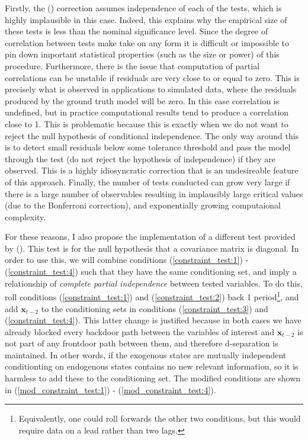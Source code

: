 \documentclass{article}
\begin{document}
Firstly, the \citeauthor{bonferroni1936teoria} (\citeyear{bonferroni1936teoria}) correction assumes independence of each of the tests, which is highly implausible in this case. Indeed, this explains why the empirical size of these tests is less than the nominal significance level. Since the degree of correlation between tests make take on any form it is difficult or impossible to pin down important statistical properties (such as the size or power) of this procedure. Furthermore, there is the issue that computation of partial correlations can be unstable if residuals are very close to or equal to zero. This is precisely what is observed in applications to simulated data, where the residuals produced by the ground truth model will be zero. In this case correlation is undefined, but in practice computational results tend to produce a correlation close to 1. This is problematic because this is exactly when we do not want to reject the null hypothesis of conditional independence. The only way around this is to detect small residuals below some tolerance threshold and pass the model through the test (do not reject the hypothesis of independence) if they are observed. This is a highly idiosyncratic correction that is an undesireable feature of this approach. Finally, the number of tests conducted can grow very large if there is a large number of observables resulting in implausibly large critical values (due to the Bonferroni correction), and exponentially growing computaional complexity.

For these reasons, I also propose the implementation of a different test provided by \citeauthor{srivastava2005some} (\citeyear{srivastava2005some}). This test is for the null hypothesis that a covariance matrix is diagonal. In order to use this, we will combine conditions (\ref{constraint_test:1}) - (\ref{constraint_test:4}) such that they have the same conditioning set, and imply a relationship of \textit{complete partial independence} between tested variables. To do this, roll conditions (\ref{constraint_test:1}) and (\ref{constraint_test:2}) back 1 period\footnote{Equivalently, one could roll forwards the other two conditions, but this would require data on a lead rather than two lags.}, and add $\mathbf{x}_{t-2}$ to the conditioning sets in conditions (\ref{constraint_test:3}) and (\ref{constraint_test:4}). This latter change is justified because in both cases we have already blocked every backdoor path between the variables of interest and $\mathbf{x}_{t-2}$ is not part of any frontdoor path between them, and therefore d-separation is maintained. In other words, if the exogenous states are mutually independent conditionting on endogenous states contains no new relevant information, so it is harmless to add these to the conditioning set. The modified conditions are shown in (\ref{mod_constraint_test:1}) - (\ref{mod_constraint_test:4}).
\end{document}
